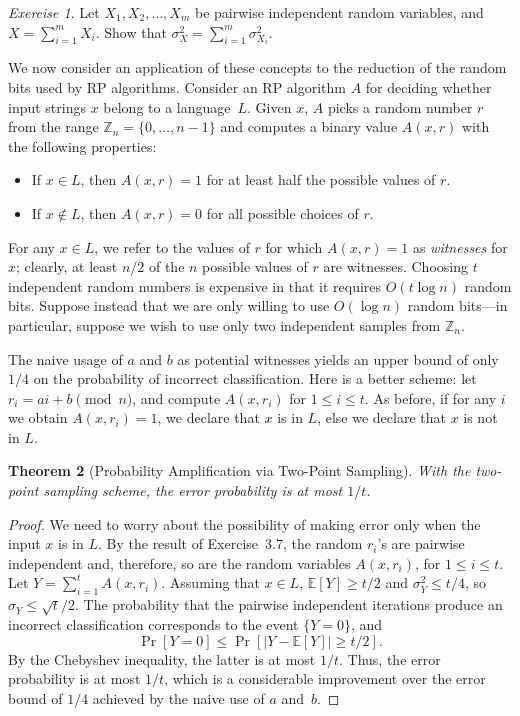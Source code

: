 \documentclass[twoside,12pt]{book}
\theoremstyle{plain}
\newtheorem{theorem}{Theorem}[chapter]
\theoremstyle{definition}
\theoremstyle{remark}
\newtheorem{exercise}[theorem]{Exercise}
\begin{document}
\begin{exercise}
Let $X_1, X_2, \ldots, X_m$ be pairwise independent random variables, and $X = \sum_{i=1}^{m} X_i$. Show that $\sigma_X^2 = \sum_{i=1}^{m} \sigma_{X_i}^2$.
\end{exercise}

We now consider an application of these concepts to the reduction of the random bits used by RP algorithms. Consider an RP algorithm $A$ for deciding whether input strings $x$ belong to a language~$L$. Given $x$, $A$ picks a random number $r$ from the range $\mathbb{Z}_n = \{0, \ldots, n-1\}$ and computes a binary value $A(x, r)$ with the following properties:
\begin{itemize}
\item If $x \in L$, then $A(x, r) = 1$ for at least half the possible values of $r$.
\item If $x \notin L$, then $A(x, r) = 0$ for all possible choices of $r$.
\end{itemize}

For any $x \in L$, we refer to the values of $r$ for which $A(x, r) = 1$ as \emph{witnesses} for $x$; clearly, at least $n/2$ of the $n$ possible values of $r$ are witnesses. Choosing $t$ independent random numbers is expensive in that it requires $O(t \log n)$ random bits. Suppose instead that we are only willing to use $O(\log n)$ random bits---in particular, suppose we wish to use only two independent samples from $\mathbb{Z}_n$.

The naive usage of $a$ and $b$ as potential witnesses yields an upper bound of only $1/4$ on the probability of incorrect classification. Here is a better scheme: let $r_i = ai + b \pmod{n}$, and compute $A(x, r_i)$ for $1 \leq i \leq t$. As before, if for any $i$ we obtain $A(x, r_i) = 1$, we declare that $x$ is in $L$, else we declare that $x$ is not in $L$.

\begin{theorem}[Probability Amplification via Two-Point Sampling]
\label{thm:two-point}
With the two-point sampling scheme, the error probability is at most $1/t$.
\end{theorem}

\begin{proof}
We need to worry about the possibility of making error only when the input $x$ is in $L$. By the result of Exercise~3.7, the random $r_i$'s are pairwise independent and, therefore, so are the random variables $A(x, r_i)$, for $1 \leq i \leq t$. Let $Y = \sum_{i=1}^{t} A(x, r_i)$. Assuming that $x \in L$, $\mathbb{E}[Y] \geq t/2$ and $\sigma_Y^2 \leq t/4$, so $\sigma_Y \leq \sqrt{t}/2$. The probability that the pairwise independent iterations produce an incorrect classification corresponds to the event $\{Y = 0\}$, and
\[
\Pr[Y = 0] \leq \Pr[|Y - \mathbb{E}[Y]| \geq t/2].
\]
By the Chebyshev inequality, the latter is at most $1/t$. Thus, the error probability is at most $1/t$, which is a considerable improvement over the error bound of $1/4$ achieved by the naive use of $a$ and~$b$.
\end{proof}
\end{document}

